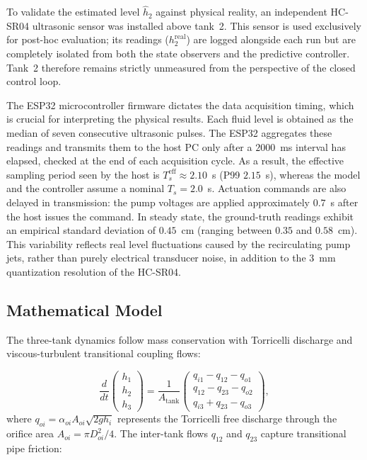 \documentclass[asi,article,accept,pdftex,moreauthors]{Definitions/mdpi}
\newcommand{\rev}[1]{#1}%
\begin{document}
{To validate the estimated level $\hat{h}_2$ against physical reality, an independent HC-SR04 ultrasonic sensor was installed above tank~2. This sensor is used exclusively for post-hoc evaluation; its readings (\rev{$h_2^\mathrm{real}$}) are logged alongside each run but are completely isolated from both the state observers and the predictive controller. Tank~2 therefore remains strictly unmeasured from the perspective of the closed control loop.}

{The ESP32 microcontroller firmware dictates the data acquisition timing, which is crucial for interpreting the physical results. Each fluid level is obtained as the median of seven consecutive ultrasonic pulses. The ESP32 aggregates these readings and transmits them to the host PC only after a $2000$~ms interval has elapsed, checked at the end of each acquisition cycle. As a result, the effective sampling period seen by the host is $T_s^\mathrm{eff} \approx 2.10$~s (P99 $2.15$~s), whereas the model and the controller assume a nominal $T_s = 2.0$~s. Actuation commands are also delayed in transmission: the pump voltages are applied approximately $0.7$~s after the host issues the command. In steady state, the ground-truth readings exhibit an empirical standard deviation of $0.45$~cm (ranging between $0.35$ and $0.58$~cm). This variability reflects real level fluctuations caused by the recirculating pump jets, rather than purely electrical transducer noise, in addition to the $3$~mm quantization resolution of the HC-SR04.}

\subsection{Mathematical Model}

The three-tank dynamics follow mass conservation with Torricelli discharge and
viscous-turbulent transitional coupling flows:

\begin{equation}
\frac{d}{dt}\begin{pmatrix}h_1\\h_2\\h_3\end{pmatrix}
= \frac{1}{A_\mathrm{tank}}
\begin{pmatrix}
  q_{i1} - q_{12} - q_{o1}\\
  q_{12} - q_{23} - q_{o2}\\
  q_{i3} + q_{23} - q_{o3}
\end{pmatrix},
\label{eq:ode}
\end{equation}
where $q_{oi} = \alpha_{oi} A_{oi} \sqrt{2g h_i}$ represents the Torricelli free discharge through the orifice area $A_{oi} = \pi D_{oi}^2 / 4$. The inter-tank flows $q_{12}$ and $q_{23}$ capture transitional pipe friction:
\end{document}
